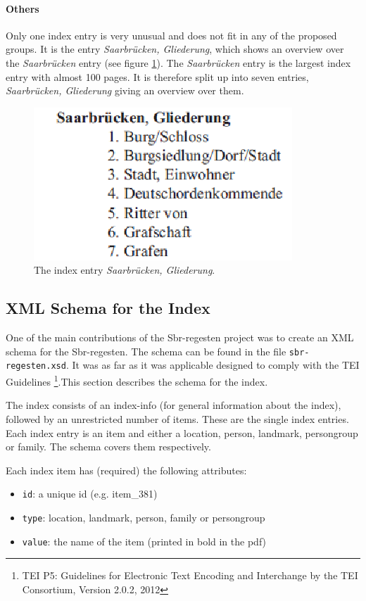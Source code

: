 \paragraph{Others}
\label{sec:other-index-entry}
Only one index entry is very unusual and does not fit in any of the proposed groups. It is the entry \textit{Saarbrücken, Gliederung}, which shows an overview over the \textit{Saarbrücken} entry (see figure \ref{fig:sb-gliederung}). The \textit{Saarbrücken} entry is the largest index entry with almost 100 pages. It is therefore split up into seven entries, \textit{Saarbrücken, Gliederung} giving an overview over them.

\begin{figure}[h]
  \centering
  \includegraphics[scale=0.6]{img/sb-gliederung}
  \caption{The index entry \textit{Saarbrücken, Gliederung}.}
  \label{fig:sb-gliederung}
\end{figure}


\subsection{XML Schema for the Index}

One of the main contributions of the Sbr-regesten project was to create an XML schema for the Sbr-regesten. The schema can be found in the file \texttt{sbr-regesten.xsd}.
It was as far as it was applicable designed to comply with the TEI Guidelines \footnote{TEI P5: Guidelines for Electronic Text Encoding and Interchange by the TEI Consortium, Version 2.0.2, 2012}.This section describes the schema for the index.

The index consists of an index-info (for general information about the index), followed by an unrestricted number of items. These are the single index entries.
Each index entry is an item and either a location, person, landmark, persongroup or family. The schema covers them respectively.

Each index item has (required) the following attributes: 
\begin{itemize}
\item \texttt{id}: a unique id (e.g. item\_381)
\item \texttt{type}: location, landmark, person, family or persongroup
\item \texttt{value}: the name of the item (printed in bold in the pdf)
\end{itemize}

